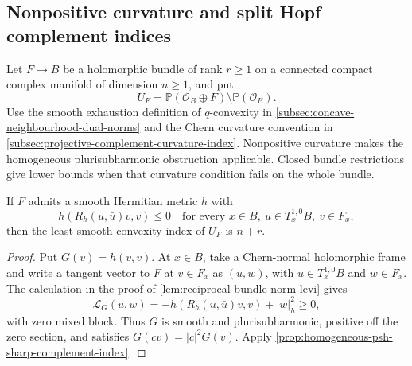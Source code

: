 \subsection{Nonpositive curvature and split Hopf complement indices}
\label{subsec:split-hopf-complement-indices}

Let $F\to B$ be a holomorphic bundle of rank $r\geq1$ on a connected compact complex manifold of dimension $n\geq1$, and put
\[
 U_F=\mathbb P(\mathcal O_B\oplus F)\setminus\mathbb P(\mathcal O_B).
\]
Use the smooth exhaustion definition of $q$-convexity in \cref{subsec:concave-neighbourhood-dual-norms} and the Chern curvature convention in \cref{subsec:projective-complement-curvature-index}. Nonpositive curvature makes the homogeneous plurisubharmonic obstruction applicable. Closed bundle restrictions give lower bounds when that curvature condition fails on the whole bundle.

\begin{corollary}\label{cor:griffiths-nonpositive-exact-complement-index}
If $F$ admits a smooth Hermitian metric $h$ with
\[
 h(R_h(u,\bar u)v,v)\leq0
 \quad\text{for every }x\in B,\ u\in T_x^{1,0}B,\ v\in F_x,
\]
then the least smooth convexity index of $U_F$ is $n+r$.
\end{corollary}
\begin{proof}
Put $G(v)=h(v,v)$. At $x\in B$, take a Chern-normal holomorphic frame and write a tangent vector to $F$ at $v\in F_x$ as $(u,w)$, with $u\in T_x^{1,0}B$ and $w\in F_x$. The calculation in the proof of \cref{lem:reciprocal-bundle-norm-levi} gives
\[
 \mathcal L_G(u,w)=-h(R_h(u,\bar u)v,v)+|w|_h^2\geq0,
\]
with zero mixed block. Thus $G$ is smooth and plurisubharmonic, positive off the zero section, and satisfies $G(cv)=|c|^2G(v)$. Apply \cref{prop:homogeneous-psh-sharp-complement-index}.
\end{proof}

